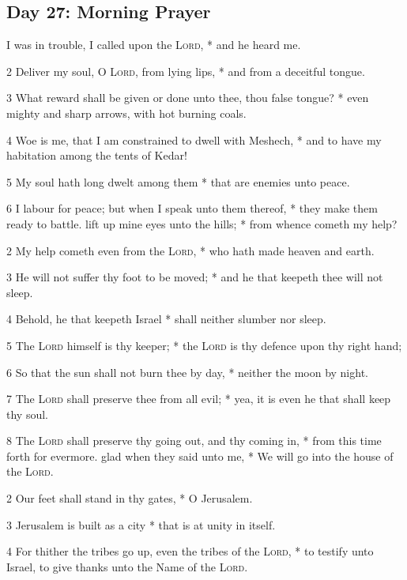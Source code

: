 \subsection{Day 27: Morning Prayer}
 I was in trouble, I called upon the {\textsc{Lord}}, * and he heard me.\par
2 Deliver my soul, O {\textsc{Lord}}, from lying lips, * and from a deceitful tongue.\par
3 What reward shall be given or done unto thee, thou false tongue? * even mighty and sharp arrows, with hot burning coals.\par
4 Woe is me, that I am constrained to dwell with Meshech, * and to have my habitation among the tents of Kedar!\par
5 My soul hath long dwelt among them * that are enemies unto peace.\par
6 I labour for peace; but when I speak unto them thereof, * they make them ready to battle.
 lift up mine eyes unto the hills; * from whence cometh my help?\par
2 My help cometh even from the {\textsc{Lord}}, * who hath made heaven and earth.\par
3 He will not suffer thy foot to be moved; * and he that keepeth thee will not sleep.\par
4 Behold, he that keepeth Israel * shall neither slumber nor sleep.\par
5 The {\textsc{Lord}} himself is thy keeper; * the {\textsc{Lord}} is thy defence upon thy right hand;\par
6 So that the sun shall not burn thee by day, * neither the moon by night.\par
7 The {\textsc{Lord}} shall preserve thee from all evil; * yea, it is even he that shall keep thy soul.\par
8 The \textsc{Lord} shall preserve thy going out, and thy coming in, * from this time forth for evermore.
 glad when they said unto me, * We will go into the house of the {\textsc{Lord}}.\par
2 Our feet shall stand in thy gates, * O Jerusalem.\par
3 Jerusalem is built as a city * that is at unity in itself.\par
4 For thither the tribes go up, even the tribes of the {\textsc{Lord}}, * to testify unto Israel, to give thanks unto the Name of the {\textsc{Lord}}.\par
